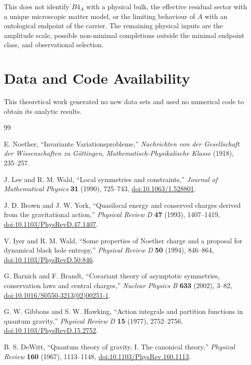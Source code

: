 \documentclass[11pt,a4paper]{article}
\def\Bfour{B4}%
\numberwithin{equation}{section}
\theoremstyle{remark}
\newcommand{\Bfour}{B^4}
\begin{document}
This does not identify \(\Bfour_A\) with a physical bulk, the effective residual sector with a unique microscopic matter model, or the limiting behaviour of \(A\) with an ontological endpoint of the carrier. The remaining physical inputs are the amplitude scale, possible non-minimal completions outside the minimal endpoint class, and observational selection.

\section*{Data and Code Availability}
This theoretical work generated no new data sets and used no numerical code to obtain its analytic results.

\begin{thebibliography}{99}

E. Noether, ``Invariante Variationsprobleme,'' \emph{Nachrichten von der Gesellschaft der Wissenschaften zu G\"ottingen, Mathematisch-Physikalische Klasse} (1918), 235--257.

J. Lee and R. M. Wald, ``Local symmetries and constraints,'' \emph{Journal of Mathematical Physics} \textbf{31} (1990), 725--743, \href{https://doi.org/10.1063/1.528801}{doi:10.1063/1.528801}.

J. D. Brown and J. W. York, ``Quasilocal energy and conserved charges derived from the gravitational action,'' \emph{Physical Review D} \textbf{47} (1993), 1407--1419, \href{https://doi.org/10.1103/PhysRevD.47.1407}{doi:10.1103/PhysRevD.47.1407}.

V. Iyer and R. M. Wald, ``Some properties of Noether charge and a proposal for dynamical black hole entropy,'' \emph{Physical Review D} \textbf{50} (1994), 846--864, \href{https://doi.org/10.1103/PhysRevD.50.846}{doi:10.1103/PhysRevD.50.846}.

G. Barnich and F. Brandt, ``Covariant theory of asymptotic symmetries, conservation laws and central charges,'' \emph{Nuclear Physics B} \textbf{633} (2002), 3--82, \href{https://doi.org/10.1016/S0550-3213(02)00251-1}{doi:10.1016/S0550-3213(02)00251-1}.

G. W. Gibbons and S. W. Hawking, ``Action integrals and partition functions in quantum gravity,'' \emph{Physical Review D} \textbf{15} (1977), 2752--2756, \href{https://doi.org/10.1103/PhysRevD.15.2752}{doi:10.1103/PhysRevD.15.2752}.

B. S. DeWitt, ``Quantum theory of gravity. I. The canonical theory,'' \emph{Physical Review} \textbf{160} (1967), 1113--1148, \href{https://doi.org/10.1103/PhysRev.160.1113}{doi:10.1103/PhysRev.160.1113}.


\end{thebibliography}
\end{document}
